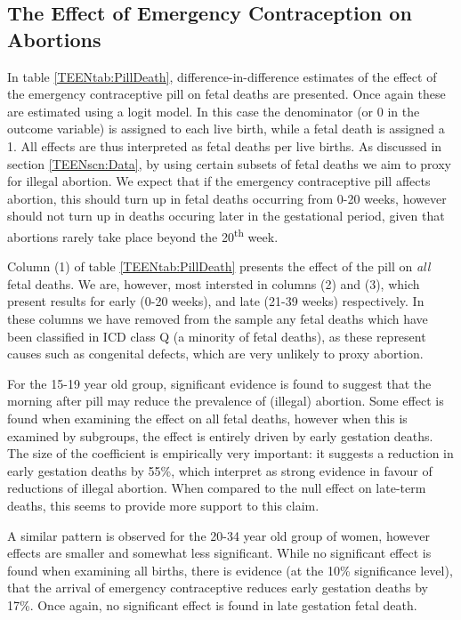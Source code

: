 \subsection{The Effect of Emergency Contraception on Abortions}
\label{TEENsscn:rabortion}
In table \ref{TEENtab:PillDeath}, difference-in-difference estimates of the 
effect of the emergency contraceptive pill on fetal deaths are presented.  Once
again these are estimated using a logit model. In this case the denominator (or
0 in the outcome variable) is assigned to each live birth, while a fetal death
is assigned a 1.  All effects are thus interpreted as fetal deaths per live 
births.  As discussed in section \ref{TEENscn:Data}, by using certain subsets of 
fetal deaths we aim to proxy for illegal abortion.  We expect that if the 
emergency contraceptive pill affects abortion, this should turn up in fetal 
deaths occurring from 0-20 weeks, however should not turn up in deaths occuring
later in the gestational period, given that abortions rarely take place beyond 
the 20\textsuperscript{th} week.

Column (1) of table \ref{TEENtab:PillDeath} presents the effect of the pill on
\emph{all} fetal deaths.  We are, however, most intersted in columns (2) and (3),
which present results for early (0-20 weeks), and late (21-39 weeks) 
respectively.  In these columns we have removed from the sample any fetal deaths
which have been classified in ICD class Q (a minority of fetal deaths), as these 
represent causes such as congenital defects, which are very unlikely to proxy
abortion.

For the 15-19 year old group, significant evidence is found to suggest that 
the morning after pill may reduce the prevalence of (illegal) abortion.  Some
effect is found when examining the effect on all fetal deaths, however when 
this is examined by subgroups, the effect is entirely driven by early gestation
deaths.  The size of the coefficient is empirically very important: it 
suggests a reduction in early gestation deaths by 55\%, which \person interpret
as strong evidence in favour of reductions of illegal abortion.  When compared 
to the null effect on late-term deaths, this seems to provide more support to
this claim.

A similar pattern is observed for the 20-34 year old group of women, however
effects are smaller and somewhat less significant.  While no significant effect
is found when examining all births, there is evidence (at the 10\% significance
level), that the arrival of emergency contraceptive reduces early gestation
deaths by 17\%.  Once again, no significant effect is found in late gestation
fetal death.

